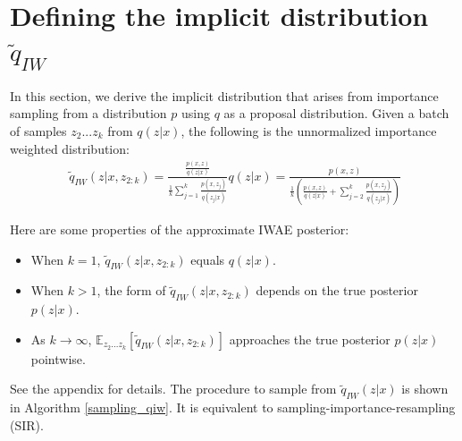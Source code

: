 \documentclass{article} %
\begin{document}






\section{Defining the implicit distribution \texorpdfstring{$\tilde{q}_{IW}$}{}}


In this section, we derive the implicit distribution that arises from importance sampling from a distribution $p$ using $q$ as a proposal distribution. Given a batch of samples $z_{2}...z_{k}$ from $q(z|x)$, the following is the unnormalized importance weighted distribution:
\begin{align} 
    \tilde{q}_{IW}(z|x,z_{2:k}) =  \frac{ \frac{p(x,z)}{q(z|x)}}{  \frac{1}{k}   \sum_{j=1}^k \frac{p(x,z_j)}{q(z_j|x)}}   q(z|x)
    = \frac{p(x,z)}{\frac{1}{k} \left(  \frac{p(x,z)}{q(z|x)}+ \sum_{j=2}^k \frac{p(x,z_j)}{q(z_j|x)} \right)} 
\label{eq:qiw}
\end{align}

Here are some properties of the approximate IWAE posterior: %
\begin{itemize}
    \item When $k=1$, $\tilde{q}_{IW}(z|x,z_{2:k})$ equals $q(z|x)$.
    \item When $k > 1$, the form of $\tilde{q}_{IW}(z|x,z_{2:k})$ depends on the true posterior $p(z|x)$.
    \item As $k \rightarrow \infty$, $\mathbb{E}_{z_2...z_k} \left[ \tilde{q}_{IW}(z|x,z_{2:k}) \right]$ approaches the true posterior $p(z|x)$ pointwise.
\end{itemize}
See the appendix for details. The procedure to sample from $\tilde{q}_{IW}(z|x)$ is shown in Algorithm \ref{sampling_qiw}. It is equivalent to sampling-importance-resampling (SIR). 
\end{document}
